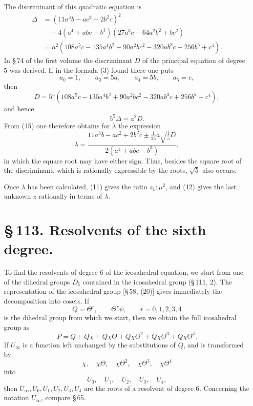 \documentclass[11pt]{article}
\begin{document}
The discriminant of this quadratic equation is
\begin{align*}
\Delta&=(11a^3b-ac^2+2b^2c)^2\\
&\quad+4(a^4+abc-b^3)(27a^3c-64a^2b^2+bc^2)\\
&=a^2(108a^5c-135a^4b^2+90a^2bc^2-320ab^3c+256b^5+c^4).
\end{align*}
In \S\,74 of the first volume the discriminant \(D\) of the principal equation of degree 5 was derived. If in the formula (3) found there one puts
\[
a_0=1,
\qquad
a_3=5a,
\qquad
a_4=5b,
\qquad
a_5=c,
\]
then
\[
D=5^5(108a^5c-135a^4b^2+90a^2bc^2-320ab^3c+256b^5+c^4),
\]
and hence
\begin{equation}
5^5\Delta=a^2D.
\tag{16}
\end{equation}
From (15) one therefore obtains for \(\lambda\) the expression
\[
\lambda=\frac{11a^3b-ac^2+2b^2c\pm\frac1{25}a\sqrt{\frac15D}}
{2(a^4+abc-b^3)},
\]
in which the square root may have either sign. Thus, besides the square root of the discriminant, which is rationally expressible by the roots, \(\sqrt5\) also occurs.

Once \(\lambda\) has been calculated, (11) gives the ratio \(z_1:\mu^2\), and (12) gives the last unknown \(z\) rationally in terms of \(\lambda\).

\section*{\S\,113. Resolvents of the sixth degree.}

To find the resolvents of degree 6 of the icosahedral equation, we start from one of the dihedral groups \(D_5\) contained in the icosahedral group (\S\,111, 2). The representation of the icosahedral group [\S\,58, (20)] gives immediately the decomposition into cosets. If
\begin{equation}
Q=\Theta^r,
\qquad
\Theta^r\psi,
\qquad r=0,1,2,3,4
\tag{1}
\end{equation}
is the dihedral group from which we start, then we obtain the full icosahedral group as
\begin{equation}
P=Q+Q\chi+Q\chi\Theta+Q\chi\Theta^2+Q\chi\Theta^3+Q\chi\Theta^4.
\tag{2}
\end{equation}
If \(U_\infty\) is a function left unchanged by the substitutions of \(Q\), and is transformed by
\[
\chi,
\quad \chi\Theta,
\quad \chi\Theta^2,
\quad \chi\Theta^3,
\quad \chi\Theta^4
\]
into
\[
U_0,
\quad U_1,
\quad U_2,
\quad U_3,
\quad U_4,
\]
then \(U_\infty,U_0,U_1,U_2,U_3,U_4\) are the roots of a resolvent of degree 6. Concerning the notation \(U_\infty\), compare \S\,65.
\end{document}
